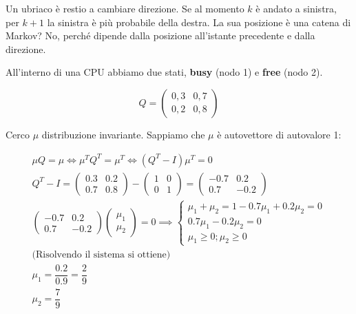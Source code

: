 
\begin{exrc}
	Un ubriaco è restio a cambiare direzione.
	Se al momento $ k $ è andato a sinistra, per $ k+1 $ la sinistra è più probabile della destra. La sua posizione è una catena di Markov? No, perché dipende dalla posizione all'istante precedente e dalla direzione.
\end{exrc}

\begin{exrc}
	All'interno di una CPU abbiamo due stati, \textbf{busy} (nodo 1) e \textbf{free} (nodo 2).
	
	\begin{equation*}
	Q = \begin{pmatrix}
	0,3 & 0,7 \\
	0,2 & 0,8
	\end{pmatrix}
	\end{equation*}
	
	Cerco $ \mu $ distribuzione invariante. Sappiamo che $ \mu $ è autovettore di autovalore 1:
	
	\begin{equation*}
	\begin{aligned}
	\mu Q = \mu \iff \mu^T Q^T = \mu^T \iff (Q^T -I)\mu^T = 0 \\
	Q^T - I = \begin{pmatrix}
	0.3 & 0.2 \\
	0.7 & 0.8
	\end{pmatrix} - \begin{pmatrix}
	1 & 0 \\ 0 & 1
	\end{pmatrix} = \begin{pmatrix}
	-0.7 & 0.2 \\
	0.7 & -0.2
	\end{pmatrix} \\
	\begin{pmatrix}
	-0.7 & 0.2 \\
	0.7 & -0.2
	\end{pmatrix} \begin{pmatrix}
	\mu_1 \\ \mu_2
	\end{pmatrix} = 0 
	\implies \begin{cases}
	\mu_1 + \mu_2 = 1
	-0.7\mu_1 + 0.2 \mu_2 = 0 \\
	0.7\mu_1 - 0.2 \mu_2 = 0 \\
	\mu_1 \geq 0; \mu_2 \geq 0
	\end{cases} \\
	\text{(Risolvendo il sistema si ottiene)} \\
	\mu_1 = \dfrac{0.2}{0.9} = \dfrac{2}{9} \\
	\mu_2 = \dfrac{7}{9}
	\end{aligned}
	\end{equation*}
\end{exrc}

